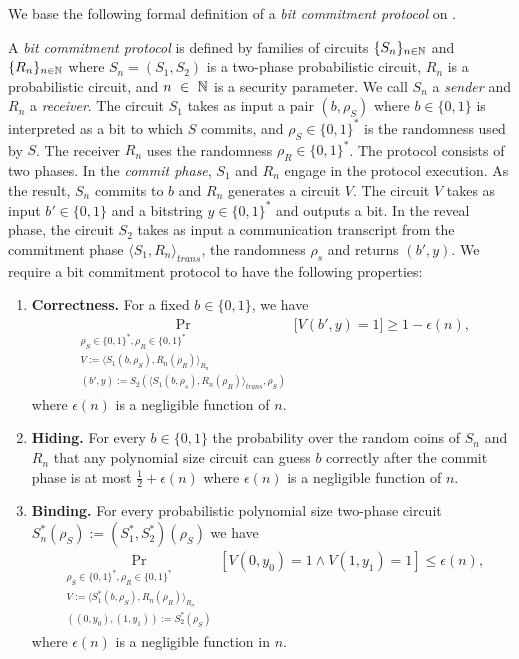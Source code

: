 We base the following formal definition of a \textit{bit commitment protocol} on \cite{LectureNotesComThCrypto}.
\begin{definition}
  \label{def:bit_commitment}
A \textit{bit commitment protocol} is defined by families of circuits $\{S_n\}_{n \in \mathbb{N}}$ and $\{R_n\}_{n \in \mathbb{N}}$
where $S_n = (S_1, S_2)$ is a two-phase probabilistic circuit, $R_n$ is a probabilistic circuit, and
$n~\in~\mathbb{N}$ is a security parameter. We call $S_n$ a \textit{sender} and $R_n$ a \textit{receiver}.
The circuit $S_1$ takes as input a pair $(b, \rho_S)$ where $b \in \{0,1\}$ is interpreted as a bit to which $S$ commits, and $\rho_S \in \{0,1\}^{*}$ is the randomness used by $S$.
The receiver $R_n$ uses the randomness $\rho_R \in \{0,1\}^{*}$.
The protocol consists of two phases. In the \textit{commit phase}, $S_1$ and $R_n$ engage in the protocol execution.
As the result, $S_n$ commits to $b$ and $R_n$ generates a circuit $V$.
The circuit $V$ takes as input $b' \in \{0,1\}$ and a bitstring $y \in \{0,1\}^{*}$ and outputs a bit.
In the \textnormal{reveal phase}, the circuit $S_2$ takes as input a communication transcript from the commitment phase
$\langle S_1, R_n \rangle_{\mathit{trans}}$, the randomness $\rho_s$ and returns $(b', y)$.
We require a bit commitment protocol to have the following properties:
\begin{enumerate}[]
\item{\textnormal{\textbf{Correctness.}}} For a fixed $b \in \{0,1\}$, we have
  \begin{align*}
    \underset{\substack{\rho_S \in \{0,1\}^{*}, \rho_R \in \{0,1\}^{*} \\
        V := \langle S_1(b,\rho_S), R_n(\rho_R) \rangle_{R_n} \\
        (b',y) := S_2(\langle S_1(b,\rho_s), R_n(\rho_R) \rangle_{\mathit{trans}},\rho_S)}}{\Pr}\Big[V(b',y) = 1 \Big] \geq 1 - \epsilon(n),
  \end{align*}
where $\epsilon(n)$ is a negligible function of $n$.
\item{\textnormal{\textbf{Hiding.}}}
  For every $b \in \{0,1\}$ the probability over the random coins of $S_n$ and $R_n$ that any polynomial size circuit
  can guess $b$ correctly after the commit phase is at most $\frac{1}{2} + \epsilon(n)$ where $\epsilon(n)$ is a negligible function of $n$.
\item{\textnormal{\textbf{Binding.}}}
  For every probabilistic polynomial size two-phase circuit $S_n^*(\rho_S) := (S^*_1, S^*_2)(\rho_S)$ we have
  \begin{align*}
    \underset{\substack{
        \rho_S \in \{0,1\}^{*}, \rho_R \in \{0,1\}^{*} \\
        V := \langle S_1^*(b,\rho_S), R_n(\rho_R) \rangle_{R_n} \\ ((0, y_0), (1, y_1)) := S_2^*(\rho_S)}}{\Pr}[V(0,y_0) = 1 \land V(1,y_1) = 1] \leq \epsilon(n),
  \end{align*}
  where $\epsilon(n)$ is a negligible function in $n$.
\end{enumerate}
\end{definition}

